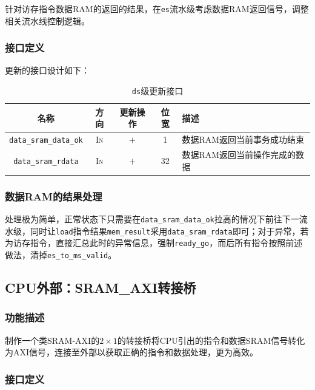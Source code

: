 \documentclass[UTF-8,twoside,c5size]{ctexart}
\begin{document}
	针对访存指令数据RAM的返回的结果，在\texttt{es}流水级考虑数据RAM返回信号，调整相关流水线控制逻辑。
	
	\subsubsection{接口定义}
	
	更新的接口设计如下：
	
	\begin{table}[!h]
		\begin{center}
			\caption{\texttt{ds}级更新接口}
			\begin{tabularx}{\textwidth}{|c|c|c|c|Y|}
				\hline
				\textbf{名称} & \textbf{方向} & \textbf{更新操作} & \textbf{位宽} & \textbf{描述} \\
				\hline
				\texttt{data_sram_data_ok} & \textsc{In} & $+$ & 1 & 数据RAM返回当前事务成功结束 \\
				\hline
				\texttt{data_sram_rdata} & \textsc{In} & $+$ & 32 & 数据RAM返回当前操作完成的数据 \\
				\hline
			\end{tabularx}
		\end{center}
	\end{table}

	\subsubsection{数据RAM的结果处理}
	
	处理极为简单，正常状态下只需要在\texttt{data_sram_data_ok}拉高的情况下前往下一流水级，同时让\texttt{load}指令结果\texttt{mem_result}采用\texttt{data_sram_rdata}即可；对于异常，若为访存指令，直接汇总此时的异常信息，强制\texttt{ready_go}，而后所有指令按照前述做法，清掉\texttt{es_to_ms_valid}。
	
	
	\subsection{CPU外部：SRAM_AXI转接桥}
	
	\subsubsection{功能描述}
	
	制作一个类SRAM-AXI的$2\times 1$的转接桥将CPU引出的指令和数据SRAM信号转化为AXI信号，连接至外部以获取正确的指令和数据处理，更为高效。
	
	\subsubsection{接口定义}
	
\end{document}
